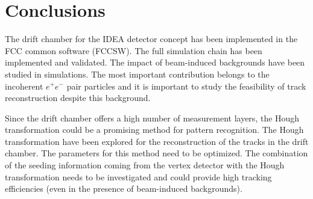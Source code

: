 \section{Conclusions}

The drift chamber for the IDEA detector concept has been implemented in the FCC common software (FCCSW). The full simulation chain has been implemented and validated. The impact of beam-induced backgrounds have been studied in simulations. The most important contribution belongs to the incoherent $e^+e^-$ pair particles and it is important to study the feasibility of track reconstruction despite this background.

Since the drift chamber offers a high number of measurement layers, the Hough transformation could be a promising method for pattern recognition. The Hough transformation have been explored for the reconstruction of the tracks in the drift chamber. The parameters for this method need to be optimized. The combination of the seeding information coming from the vertex detector with the Hough transformation needs to be investigated and could provide high tracking efficiencies (even in the presence of beam-induced backgrounds).
